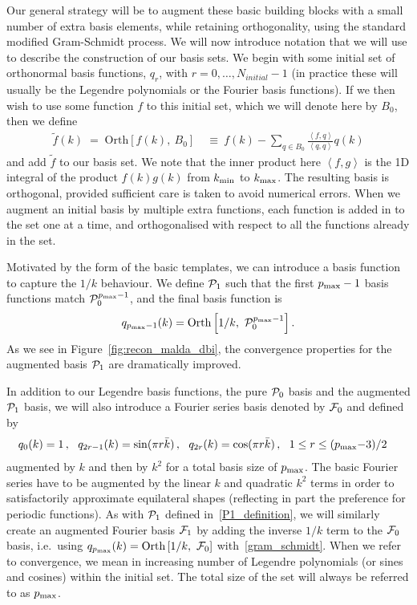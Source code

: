 Our general strategy will be to augment these basic building blocks
with a small number of extra basis elements, while retaining orthogonality,
using the standard modified Gram-Schmidt process.
We will now introduce notation that we will use to describe the construction of our basis sets.
We begin with some initial set of orthonormal basis functions, $q_r$, with $r=0,\ldots,N_{initial}-1$
(in practice these will usually be the
Legendre polynomials or the Fourier basis functions).
If we then wish to use some function $f$ to this initial set, which we will denote here by $B_0$,
then we define
\begin{align}\label{gram_schmidt}
    \tilde {f}(k) \;=\;  \text{Orth}\left [f(k),~B_0\right] &~\equiv~ f(k) - \sum_{q\in B_0}\frac{\left\langle f,q \right\rangle}{\left\langle q,q \right\rangle}q(k)
\end{align}
and add $\tilde{f}$ to our basis set.
We note that the inner product here $\left\langle f,g \right\rangle$
is the 1D integral of the product $f(k)g(k)$ from ${k_\text{min}}$ to ${k_\text{max}}$.
The resulting basis is orthogonal, provided sufficient
care is taken to avoid numerical errors.
When we augment an initial basis by multiple extra functions, each function
is added in to the set one at a time, and orthogonalised with respect to all the
functions already in the set.


Motivated by the form of the basic templates, we can introduce a basis function to capture the $1/k$ behaviour.
We define $\mathcal{P}_1$ such that the first $p_\text{max}-1$ basis functions match $\mathcal{P}_0^{p_\text{max}-1}$,
and the final basis function is
\begin{align}\label{P1_definition}
    q_{p_\text{max}-1}(k) = \text{Orth}\left[{1}/ {k},~\mathcal{P}_0^{p_\text{max}-1}\right].
\end{align}
As we see in Figure~\ref{fig:recon_malda_dbi}, the convergence properties for the augmented basis  $\mathcal{P}_1$ are dramatically improved.


In addition to our Legendre basis functions, the pure $\mathcal{P}_0$ basis and
the augmented $\mathcal{P}_1$ basis, we will also introduce a Fourier series basis denoted by $\mathcal{F}_0$ and defined by
\begin{align}\label{F0_definition}
    &q_{0}(k)    = 1\,, ~~
    q_{2r-1}(k)   = \sin(\pi r\bar{k})\,,  ~~
    q_{2r}(k) = \cos(\pi r\bar{k})\,,  ~~  1\leq r\leq(p_\text{max}\text{$-$}3)/2
\end{align}
augmented by $k$ and then by $k^2$ for a total basis size of $p_\text{max}$.
The basic Fourier series have to be augmented by the linear $k$ and quadratic $k^2$ terms
in order to satisfactorily approximate equilateral shapes (reflecting in part the preference for periodic functions). 
As with $\mathcal{P}_1$ defined in~\eqref{P1_definition}, we will similarly create an augmented Fourier basis $\mathcal{F}_1$
by adding the inverse $1/k$ term to the $\mathcal{F}_0$ basis, i.e.\ using
$q_{p_{\rm max}}(k) = \text{Orth}\left[{1}/ {k},~\mathcal{F}_0\right]$ with~\eqref{gram_schmidt}.
When we refer to convergence, we mean in increasing number
of Legendre polynomials (or sines and cosines) within the initial set.
The total size of the set will always be referred to as $p_\text{max}$.

